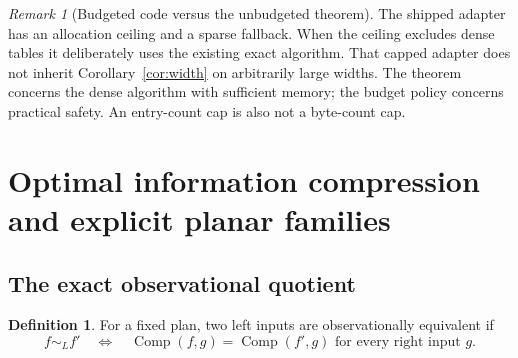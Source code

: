 \documentclass[11pt,letterpaper]{article}
\theoremstyle{definition}
\newtheorem{definition}[theorem]{Definition}
\theoremstyle{remark}
\newtheorem{remark}[theorem]{Remark}
\newcommand{\Comp}{\operatorname{Comp}}
\begin{document}
\begin{remark}[Budgeted code versus the unbudgeted theorem]
The shipped adapter has an allocation ceiling and a sparse fallback.
When the ceiling excludes dense tables it deliberately uses the existing
exact algorithm. That capped adapter does not inherit
Corollary~\ref{cor:width} on arbitrarily large widths. The theorem concerns
the dense algorithm with sufficient memory; the budget policy concerns
practical safety. An entry-count cap is also not a byte-count cap.
\end{remark}

\section{Optimal information compression and explicit planar families}
\label{sec:optimal}
\subsection{The exact observational quotient}
\begin{definition}
For a fixed plan, two left inputs are observationally equivalent if
\[
 f\sim_L f'\quad\Longleftrightarrow\quad
 \Comp(f,g)=\Comp(f',g)\text{ for every right input }g.
\]
\end{definition}
\end{document}
